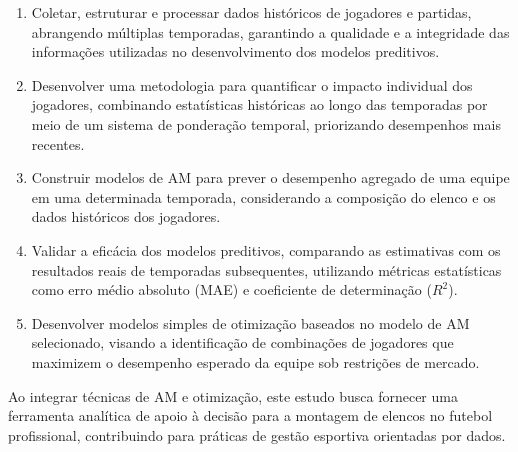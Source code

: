 \begin{enumerate}
    \item Coletar, estruturar e processar dados históricos de 
    jogadores e partidas, abrangendo múltiplas temporadas, 
    garantindo a qualidade e a integridade das informações utilizadas 
    no desenvolvimento dos modelos preditivos.
    \item Desenvolver uma metodologia para quantificar o impacto 
    individual dos jogadores, combinando estatísticas históricas ao 
    longo das temporadas por meio de um sistema de ponderação temporal, 
    priorizando desempenhos mais recentes.
    \item Construir modelos de AM para prever o desempenho agregado 
    de uma equipe em uma determinada temporada, considerando a 
    composição do elenco e os dados históricos dos jogadores.
    \item Validar a eficácia dos modelos preditivos, comparando 
    as estimativas com os resultados reais de temporadas subsequentes, 
    utilizando métricas estatísticas como erro médio absoluto (MAE) e 
    coeficiente de determinação ($R^2$).
    \item Desenvolver modelos simples de otimização baseados no 
    modelo de AM selecionado, visando a identificação de combinações 
    de jogadores que maximizem o desempenho esperado da equipe 
    sob restrições de mercado.
\end{enumerate}

Ao integrar técnicas de AM e otimização, este estudo busca 
fornecer uma ferramenta analítica de apoio à decisão para a 
montagem de elencos no futebol profissional, contribuindo para 
práticas de gestão esportiva orientadas por dados.